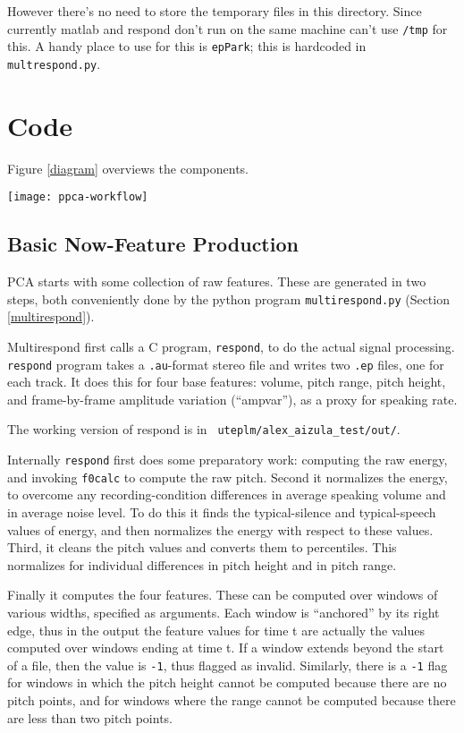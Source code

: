 \documentclass[11pt]{article}
\begin{document}
However there's no need to store the temporary files in this
directory.  Since currently matlab and respond don't run on the same
machine can't use {\tt /tmp} for this.  A handy place to use for this
is {\tt epPark}; this is hardcoded in {\tt multrespond.py}.


\section{Code}

Figure \ref{diagram} overviews the components.

\begin{figure*}[tp]
 \centerline{ 
 \texttt{[image: ppca-workflow]}
 }
\caption{Workflow Overview}
\label{diagram}
\end{figure*}


\subsection{Basic Now-Feature Production}

PCA starts with some collection of raw features.  These are generated
in two steps, both conveniently done by the python program
{\tt multirespond.py} (Section \ref{multirespond}).

Multirespond first calls a C program, {\tt respond}, to do the actual
signal processing.  {\tt respond} program takes a {\tt .au}-format
stereo file and writes two {\tt .ep} files, one for each track.  It
does this for four base features: volume, pitch range, pitch height,
and frame-by-frame amplitude variation (``ampvar''), as a proxy for
speaking rate.

The working version of respond is in {\tt
  uteplm/alex\_aizula\_test/out/}.

Internally {\tt respond} first does some preparatory work: computing
the raw energy, and invoking {\tt f0calc} to compute the raw pitch.
Second it normalizes the energy, to overcome any recording-condition
differences in average speaking volume and in average noise level.  To
do this it finds the typical-silence and typical-speech values of
energy, and then normalizes the energy with respect to these
values. Third, it cleans the pitch values and converts them to
percentiles.  This normalizes for individual differences in pitch
height and in pitch range.

Finally it computes the four features.  These can be computed over
windows of various widths, specified as arguments.  Each window is
``anchored'' by its right edge, thus in the output the feature values
for time t are actually the values computed over windows ending at
time t.  If a window extends beyond the start of a file, then the
value is {\tt -1}, thus flagged as invalid.  Similarly, there is a
{\tt -1} flag for windows in which the pitch height cannot be computed
because there are no pitch points, and for windows where the range
cannot be computed because there are less than two pitch points.
\end{document}
